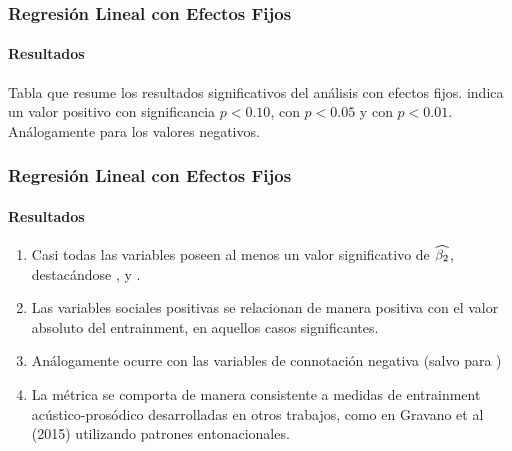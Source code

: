 \begin{frame}
\frametitle{Regresión Lineal con Efectos Fijos}
\framesubtitle{Resultados}

\begin{table}
  
\end{table}

Tabla que resume los resultados significativos del análisis con efectos fijos. \psl indica un valor positivo con significancia $p < 0.10$,  \ppsl con $p < 0.05$  y \pppsl con $p < 0.01$. Análogamente para los valores negativos.

\end{frame}


\begin{frame}
\frametitle{Regresión Lineal con Efectos Fijos}
\framesubtitle{Resultados}
\begin{enumerate}
  \item Casi todas las variables \ap poseen al menos un valor significativo de $\widehat{\beta_2}$, destacándose \ENGMEAN, \NOISETOHARMONICS y \FOMEAN.
  \item Las variables sociales positivas se relacionan de manera positiva con el valor absoluto del entrainment, en aquellos casos significantes.
  \item Análogamente ocurre con las variables de connotación negativa (salvo \svdifficult para \ENGMEAN)
  \item La métrica se comporta de manera consistente a medidas de entrainment acústico-prosódico desarrolladas en otros trabajos, como en Gravano et al (2015) utilizando patrones entonacionales.
\end{enumerate}
\end{frame}
